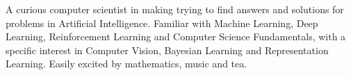 

\begin{cvparagraph}

A curious computer scientist in making trying to find answers and solutions for problems in Artificial Intelligence. Familiar with Machine Learning, Deep Learning, Reinforcement Learning and Computer Science Fundamentals, with a specific interest in Computer Vision, Bayesian Learning and Representation Learning. Easily excited by mathematics, music and tea.
\end{cvparagraph}
